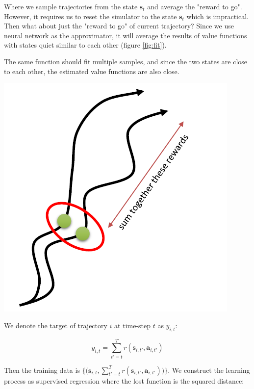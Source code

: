 \documentclass{tufte-handout}
\newcommand{\s}{\mathbf{s}}
\newcommand{\act}{\mathbf{a}}
\begin{document}
Where we sample trajectories from the state $\s_t$ and average the "reward to go". However, it requires us to reset the simulator to the state $\s_t$ which is impractical. Then what about just the "reward to go" of current trajectory? Since we use neural network as the approximator, it will average the results of value functions with states quiet similar to each other (figure \ref{fig:fit}).

\begin{marginfigure}
\caption{The same function should fit multiple samples, and since the two states are close to each other, the estimated value functions are also close.}
\includegraphics[width=\linewidth]{fit}
\label{fig:fit}
\end{marginfigure}

We denote the target of trajectory $i$ at time-step $t$ as $y_{i,t}$:

\begin{equation}
\label{eq:14}
y_{i,t} = \sum_{t'=t} ^ T r(\s_{i,t'}, \act_{i, t'})
\end{equation}

Then the training data is $\Big\{\Big(\s_{i,t}, \sum_{t'=t} ^ T r(\s_{i,t'}, \act_{i, t'}) \Big) \Big\}$. We construct the learning process as supervised regression where the lost function is the squared distance:
\end{document}
